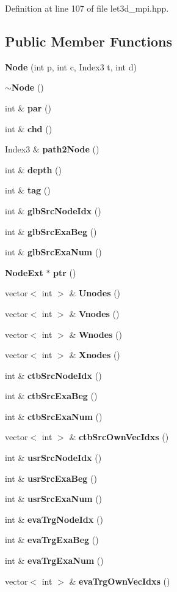 Definition at line 107 of file let3d\_\-mpi.hpp.\subsection*{Public Member Functions}
\begin{CompactItemize}
\item 
{\bf Node} (int p, int c, Index3 t, int d)
\item 
{\bf $\sim$Node} ()
\item 
int \& {\bf par} ()
\item 
int \& {\bf chd} ()
\item 
Index3 \& {\bf path2Node} ()
\item 
int \& {\bf depth} ()
\item 
int \& {\bf tag} ()
\item 
int \& {\bf glb\-Src\-Node\-Idx} ()
\item 
int \& {\bf glb\-Src\-Exa\-Beg} ()
\item 
int \& {\bf glb\-Src\-Exa\-Num} ()
\item 
{\bf Node\-Ext} $\ast$ {\bf ptr} ()
\item 
vector$<$ int $>$ \& {\bf Unodes} ()
\item 
vector$<$ int $>$ \& {\bf Vnodes} ()
\item 
vector$<$ int $>$ \& {\bf Wnodes} ()
\item 
vector$<$ int $>$ \& {\bf Xnodes} ()
\item 
int \& {\bf ctb\-Src\-Node\-Idx} ()
\item 
int \& {\bf ctb\-Src\-Exa\-Beg} ()
\item 
int \& {\bf ctb\-Src\-Exa\-Num} ()
\item 
vector$<$ int $>$ \& {\bf ctb\-Src\-Own\-Vec\-Idxs} ()
\item 
int \& {\bf usr\-Src\-Node\-Idx} ()
\item 
int \& {\bf usr\-Src\-Exa\-Beg} ()
\item 
int \& {\bf usr\-Src\-Exa\-Num} ()
\item 
int \& {\bf eva\-Trg\-Node\-Idx} ()
\item 
int \& {\bf eva\-Trg\-Exa\-Beg} ()
\item 
int \& {\bf eva\-Trg\-Exa\-Num} ()
\item 
vector$<$ int $>$ \& {\bf eva\-Trg\-Own\-Vec\-Idxs} ()
\end{CompactItemize}
